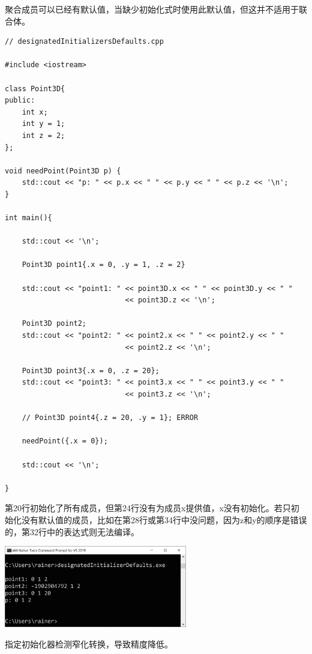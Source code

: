 聚合成员可以已经有默认值，当缺少初始化式时使用此默认值，但这并不适用于联合体。

\begin{lstlisting}[style=styleCXX]
// designatedInitializersDefaults.cpp

#include <iostream>

class Point3D{
public:
	int x;
	int y = 1;
	int z = 2;
};

void needPoint(Point3D p) {
	std::cout << "p: " << p.x << " " << p.y << " " << p.z << '\n';
}

int main(){
	
	std::cout << '\n';
	
	Point3D point1{.x = 0, .y = 1, .z = 2}
	
	std::cout << "point1: " << point3D.x << " " << point3D.y << " "
							<< point3D.z << '\n';
							 
	Point3D point2;		 
	std::cout << "point2: " << point2.x << " " << point2.y << " "
							<< point2.z << '\n';
				
    Point3D point3{.x = 0, .z = 20};			 
	std::cout << "point3: " << point3.x << " " << point3.y << " "
							<< point3.z << '\n';
	
	// Point3D point4{.z = 20, .y = 1}; ERROR
	
	needPoint({.x = 0});
	
	std::cout << '\n';
	
}
\end{lstlisting}

第20行初始化了所有成员，但第24行没有为成员x提供值，x没有初始化。若只初始化没有默认值的成员，比如在第28行或第34行中没问题，因为z和y的顺序是错误的，第32行中的表达式则无法编译。

\begin{center}
\includegraphics[width=0.6\textwidth]{content/3/chapter4/images/34.png}\\
\end{center}

指定初始化器检测窄化转换，导致精度降低。

